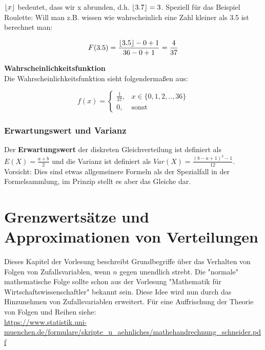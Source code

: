 \documentclass[a4paper]{article}
\DeclarePairedDelimiter\floor{\lfloor}{\rfloor}
\begin{document}
\noindent $\floor*{x}$ bedeutet, dass wir x abrunden, d.h. $\floor{3.7} = 3$. Speziell für das Beispiel Roulette: Will man z.B. wissen wie wahrscheinlich eine Zahl kleiner als 3.5 ist berechnet man:

\begin{equation*}
    F(3.5) = \frac{\floor*{3.5}-0+1}{36-0+1} = \frac{4}{37}
\end{equation*}


\noindent \textbf{Wahrscheinlichkeitsfunktion}\\
Die Wahrscheinlichkeitsfunktion sieht folgendermaßen aus:

\begin{equation*}
    f(x)=\begin{cases}
			\frac{1}{37}, & \text{$x \in \{0,1,2,..,36\}$}\\
            0, & \text{sonst}
		 \end{cases}
\end{equation*}


\subsubsection{Erwartungswert und Varianz} \label{sec:Expec}
Der \textbf{Erwartungswert} der diskreten Gleichverteilung ist definiert als $E(X) = \frac{a+b}{2}$ und die Varianz ist definiert als $Var(X) = \frac{(b-a+1)^2-1}{12}$. Vorsicht: Dies sind etwas allgemeinere Formeln als der Spezialfall in der Formelsammlung, im Prinzip stellt es aber das Gleiche dar.




\newpage




\section{Grenzwertsätze und Approximationen von Verteilungen} \label{sec:GWSapprox}

Dieses Kapitel der Vorlesung beschreibt Grundbegriffe über das Verhalten von Folgen von Zufallsvariablen, wenn $n$ gegen unendlich strebt. Die "normale" mathematische Folge sollte schon aus der Vorlesung "Mathematik für Wirtschaftswissenschaftler" bekannt sein. Diese Idee wird nun durch das Hinzunehmen von Zufallsvariablen erweitert. Für eine Auffrischung der Theorie von Folgen und Reihen siehe:\\
\url{https://www.statistik.uni-muenchen.de/formulare/skripte_u_aehnliches/mathehandrechnung_schneider.pdf}
\end{document}
